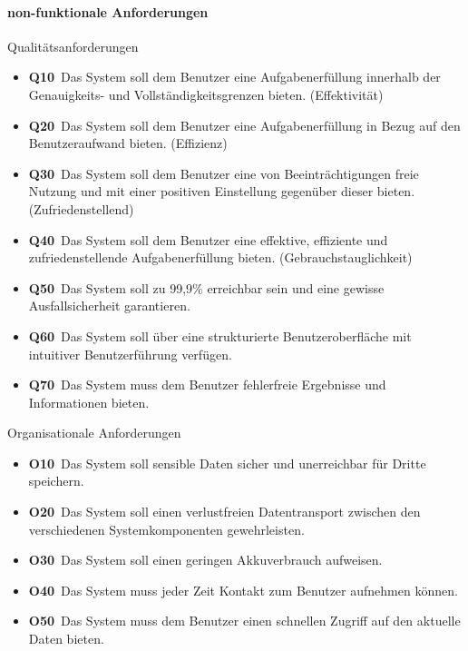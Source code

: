 \documentclass[a4paper,11pt]{article}%
\renewcommand{\\}{\vspace*{0.5\baselineskip} \newline}
\begin{document}
	\paragraph{non-funktionale Anforderungen}\mbox{}\\
	Qualitätsanforderungen
	\begin{itemize}
		\item \lbrack \textbf{Q10}\rbrack \ Das System soll dem Benutzer eine Aufgabenerfüllung innerhalb der Genauigkeits- und Vollständigkeitsgrenzen bieten. (Effektivität)
		\item \lbrack \textbf{Q20}\rbrack \ Das System soll dem Benutzer eine Aufgabenerfüllung in Bezug auf den Benutzeraufwand bieten. (Effizienz)
		\item \lbrack \textbf{Q30}\rbrack \ Das System soll dem Benutzer eine von Beeinträchtigungen freie Nutzung und mit einer positiven Einstellung gegenüber dieser bieten. (Zufriedenstellend)
		\item \lbrack \textbf{Q40}\rbrack \ Das System soll dem Benutzer eine effektive, effiziente und zufriedenstellende Aufgabenerfüllung bieten. (Gebrauchstauglichkeit)
		\item \lbrack \textbf{Q50}\rbrack \ Das System soll zu 99,9\% erreichbar sein und eine gewisse Ausfallsicherheit garantieren.
		\item \lbrack \textbf{Q60}\rbrack \ Das System soll über eine strukturierte Benutzeroberfläche mit intuitiver Benutzerführung verfügen.
		\item \lbrack \textbf{Q70}\rbrack \ Das System muss dem Benutzer fehlerfreie Ergebnisse und Informationen bieten.
	\end{itemize}
	Organisationale Anforderungen
	\begin{itemize}
		\item \lbrack \textbf{O10}\rbrack \ Das System soll sensible Daten sicher und unerreichbar für Dritte speichern.
		\item \lbrack \textbf{O20}\rbrack \ Das System soll einen verlustfreien Datentransport zwischen den verschiedenen Systemkomponenten gewehrleisten.  
		\item \lbrack \textbf{O30}\rbrack \ Das System soll einen geringen Akkuverbrauch aufweisen.
		\item \lbrack \textbf{O40}\rbrack \ Das System muss jeder Zeit Kontakt zum Benutzer aufnehmen können.
		\item \lbrack \textbf{O50}\rbrack \ Das System muss dem Benutzer einen schnellen Zugriff auf den aktuelle Daten bieten.  
	\end{itemize}
\newpage
\end{document}

